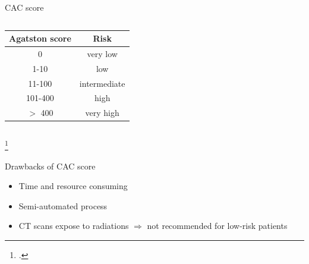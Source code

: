 \documentclass[compress,aspectratio=169,xcolor=table]{beamer}
\begin{document}
\begin{frame}{CAC score}
\begin{columns}[onlytextwidth]
			\begin{tabular}{|c|c|}
				\hline
				Agatston score & Risk \\
				\hline
				0 & very low \\
				1-10 & low \\
				11-100 & intermediate \\
				101-400 & high \\
				$>$ 400 & very high \\
				\hline
			\end{tabular}
	\end{columns}
	\footcitetext{AGATSTON1990827}
\end{frame}


\begin{frame}{Drawbacks of CAC score}
	\begin{itemize}
		\item Time and resource consuming
		\item Semi-automated process
		\item CT scans expose to radiations $\Rightarrow$ not recommended for low-risk patients
	\end{itemize}
\end{frame}
\end{document}
